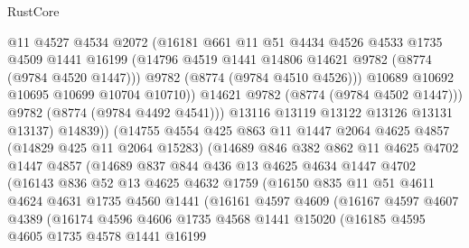 \begin{lexlean}{RustCore}
\begin{coremodule}
                      @11
                      @4527
                      @4534
                      @2072
                      (@16181
                        @661
                        @11
                        @51
                        @4434
                        @4526
                        @4533
                        @1735
                        @4509
                        @1441
                        @16199
                        (@14796 @4519 @1441 @14806 @14621 @9782 (@8774 (@9784 @4520 @1447)))
                        @9782
                        (@8774 (@9784 @4510 @4526)))
                      @10689
                      @10692
                      @10695
                      @10699
                      @10704
                      @10710))
                  @14621
                  @9782
                  (@8774 (@9784 @4502 @1447)))
                @9782
                (@8774 (@9784 @4492 @4541)))
              @13116
              @13119
              @13122
              @13126
              @13131
              @13137)
            @14839))
        (@14755
          @4554
          @425
          @863
          @11
          @1447
          @2064
          @4625
          @4857
          (@14829 @425 @11 @2064 @15283)
          (@14689
            @846
            @382
            @862
            @11
            @4625
            @4702
            @1447
            @4857
            (@14689
              @837
              @844
              @436
              @13
              @4625
              @4634
              @1447
              @4702
              (@16143
                @836
                @52
                @13
                @4625
                @4632
                @1759
                (@16150
                  @835
                  @11
                  @51
                  @4611
                  @4624
                  @4631
                  @1735
                  @4560
                  @1441
                  (@16161
                    @4597
                    @4609
                    (@16167
                      @4597
                      @4607
                      @4389
                      (@16174
                        @4596
                        @4606
                        @1735
                        @4568
                        @1441
                        @15020
                        (@16185
                          @4595
                          @4605
                          @1735
                          @4578
                          @1441
                          @16199

\end{coremodule}
\end{lexlean}
